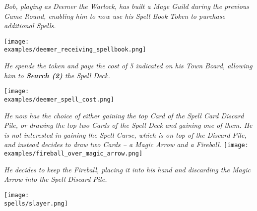 \begin{multicols*}{2}
\textit{Bob, playing as Deemer the Warlock, has built a Mage Guild during the previous Game Round, enabling him to now use his Spell Book Token to purchase additional Spells.}\par
\texttt{[image: \\examples/deemer\_receiving\_spellbook.png]}\par
\textit{He spends the token and pays the cost of 5  indicated on his Town Board, allowing him to \textbf{Search (2)} the Spell Deck.}\par
\texttt{[image: \\examples/deemer\_spell\_cost.png]}\par
\textit{He now has the choice of either gaining the top Card of the Spell Card Discard Pile, or drawing the top two Cards of the Spell Deck and gaining one of them.
He is not interested in gaining the Spell Curse, which is on top of the Discard Pile, and instead decides to draw two Cards – a Magic Arrow and a Fireball.}
\texttt{[image: \\examples/fireball\_over\_magic\_arrow.png]}\par
\textit{He decides to keep the Fireball, placing it into his hand and discarding the Magic Arrow into the Spell Discard Pile.}

\vspace*{\fill}

\begin{center}
    \texttt{[image: \\spells/slayer.png]}
\end{center}

\end{multicols*}
